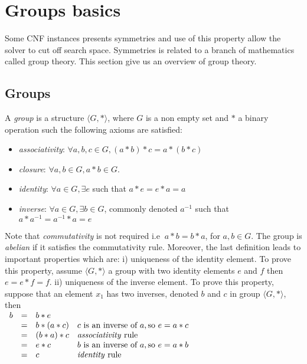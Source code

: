 \section{Groups basics}

Some CNF instances presents symmetries and use of this property allow the solver to cut off search space.
Symmetries is related to a branch of mathematics called group theory. This section give us an overview of group
theory.

\subsection{Groups}

A \emph{group} is a structure $\langle G, * \rangle$, where $G$ is a non empty set and $*$ a binary
operation such the following axioms are satisfied:
\begin{itemize}[noitemsep,nolistsep]
	\item \emph{associativity}: $\forall a, b, c \in G, (a * b) * c = a * (b * c)$
	\item \emph{closure}: $\forall a, b \in G, a * b \in G$.
	\item \emph{identity}: $\forall a \in G, \exists e$ such that $ a * e = e * a = a$
	\item \emph{inverse}:  $\forall a \in G, \exists b \in G$, commonly denoted $a^{-1}$ such that
	 $a * a^{-1} = a^{-1} * a = e$
\end{itemize}

Note that \emph{commutativity} is not required i.e $\ a * b = b * a$, for $a, b \in G$.
The group is \emph{abelian} if it satisfies the commutativity rule.
Moreover, the last definition leads to important properties which are: i) uniqueness of the identity element. 
To prove this property, assume $\langle G, * \rangle$ a group with two identity elements $e$ and $f$ 
then $ e = e * f = f$.
ii) uniqueness of the inverse element. To prove this property, suppose that an element $x_1$ has two inverses,
denoted $b$ and $c$ in group $\langle G, * \rangle$, then\\
	$\begin{array}{lcll}					
			b & = & b * e & \\
			  & = & b * (a * c) & c \text{ is an inverse of } a, \text{so } e = a * c\\
			  & = & (b * a) * c &   \text{\emph{associativity} rule}\\
			  & = & e * c       & b \text{ is an inverse of } a, \text{so } e = a * b\\
			  & = & c           &   \text{\emph{identity} rule}
	\end{array}$


